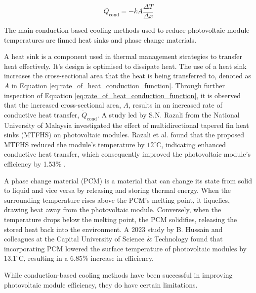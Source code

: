 \begin{equation}
    \dot{Q}_\text{cond} = -kA\frac{\Delta T}{\Delta x}
    \label{eq:rate_of_heat_conduction_function}
\end{equation}

The main conduction-based cooling methods used to reduce photovoltaic module temperatures are finned heat sinks and phase change materials.\vspace{0.5em}


A heat sink is a component used in thermal management strategies to transfer heat effectively. It's design is optimised to dissipate heat. \cite{Kumar2024QualitativeReview} The use of a heat sink increases the cross-sectional area that the heat is being transferred to, denoted as $A$ in Equation \ref{eq:rate_of_heat_conduction_function}. Through further inspection of Equation \ref{eq:rate_of_heat_conduction_function}, it is observed that the increased cross-sectional area, $A$, results in an increased rate of conductive heat transfer, $\dot{Q}_\text{cond}$. A study led by S.N. Razali from the National University of Malaysia investigated the effect of multidirectional tapered fin heat sinks (MTFHS) on photovoltaic modules. Razali et al. found that the proposed MTFHS reduced the module's temperature by $12^\circ \text{C}$, indicating enhanced conductive heat transfer, which consequently improved the photovoltaic module's efficiency by 1.53\% \cite{Razali2023PerformanceMTFHS}.\vspace{0.5em}

A phase change material (PCM) is a material that can change its state from solid to liquid and vice versa by releasing and storing thermal energy. \cite{Nicholas2019ActivatedMaterial} When the surrounding temperature rises above the PCM’s melting point, it liquefies, drawing heat away from the photovoltaic module. Conversely, when the temperature drops below the melting point, the PCM solidifies, releasing the stored heat back into the environment. A 2023 study by B. Hussain and colleagues at the Capital University of Science \& Technology found that incorporating PCM lowered the surface temperature of photovoltaic modules by $13.1^\circ \text{C}$, resulting in a 6.85\% increase in efficiency. \cite{Hussain2023Phase}\vspace{0.5em}

While conduction-based cooling methods have been successful in improving photovoltaic module efficiency, they do have certain limitations.\par
\par

